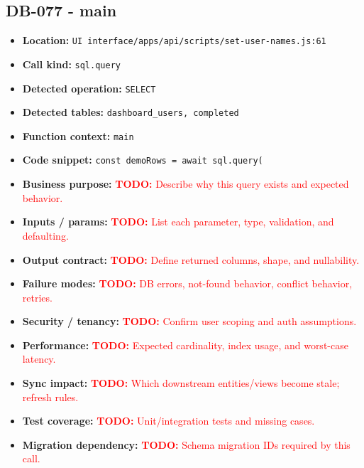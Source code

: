 \documentclass[11pt]{article}
\newcommand{\todoitem}[1]{\textcolor{red}{\textbf{TODO:} #1}}
\begin{document}
\subsection{DB-077 - main}
\begin{itemize}[leftmargin=1.5em]
\item \textbf{Location:} \texttt{UI interface/apps/api/scripts/set-user-names.js:61}
\item \textbf{Call kind:} \texttt{sql.query}
\item \textbf{Detected operation:} \texttt{SELECT}
\item \textbf{Detected tables:} \texttt{dashboard\_users, completed}
\item \textbf{Function context:} \texttt{main}
\item \textbf{Code snippet:} \texttt{const demoRows = await sql.query(}
\item \textbf{Business purpose:} \todoitem{Describe why this query exists and expected behavior.}
\item \textbf{Inputs / params:} \todoitem{List each parameter, type, validation, and defaulting.}
\item \textbf{Output contract:} \todoitem{Define returned columns, shape, and nullability.}
\item \textbf{Failure modes:} \todoitem{DB errors, not-found behavior, conflict behavior, retries.}
\item \textbf{Security / tenancy:} \todoitem{Confirm user scoping and auth assumptions.}
\item \textbf{Performance:} \todoitem{Expected cardinality, index usage, and worst-case latency.}
\item \textbf{Sync impact:} \todoitem{Which downstream entities/views become stale; refresh rules.}
\item \textbf{Test coverage:} \todoitem{Unit/integration tests and missing cases.}
\item \textbf{Migration dependency:} \todoitem{Schema migration IDs required by this call.}
\end{itemize}
\end{document}
